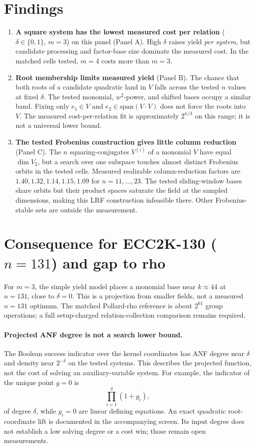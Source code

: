 \documentclass[11pt]{article}
\begin{document}
\section*{Findings}
\begin{enumerate}
\item \textbf{A square system has the lowest measured cost per relation} ($\delta\in\{0,1\}$,
$m=3$) on this panel (Panel A). High $\delta$ raises yield \emph{per system}, but candidate processing
and factor-base size dominate the measured cost. In the matched cells tested, $m=4$ costs more
than $m=3$.
\item \textbf{Root membership limits measured yield} (Panel B). The chance that both roots of a
candidate quadratic land in $V$ falls across the tested $n$ values at fixed $\delta$. The tested
monomial, $w^2$-power, and shifted bases occupy a similar band. Fixing only $e_1\in V$ and
$e_2\in\mathrm{span}(V\!\cdot\!V)$ does not force the roots into $V$. The measured cost-per-relation
fit is approximately $2^{n/3}$ on this range; it is not a universal lower bound.
\item \textbf{The tested Frobenius construction gives little column reduction} (Panel C).
The $n$ squaring-conjugates $V^{(i)}$ of a monomial $V$ have equal $\dim V_2$, but a search over
one subspace touches almost distinct Frobenius orbits in the tested cells. Measured realizable
column-reduction factors are $1.40,1.32,1.14,1.15,1.09$ for $n=11,\dots,23$.
The tested sliding-window bases share orbits but their product spaces saturate the field at
the sampled dimensions, making this LRF construction infeasible there. Other Frobenius-stable
sets are outside the measurement.
\end{enumerate}

\section*{Consequence for ECC2K-130 ($n=131$) and gap to rho}
For $m=3$, the simple yield model places a monomial base near $k\approx44$ at $n=131$, close to
$\delta=0$. This is a projection from smaller fields, not a measured $n=131$ optimum. The matched
Pollard-rho reference is about $2^{61}$ group operations; a full setup-charged relation-collection
comparison remains required.

\paragraph{Projected ANF degree is not a search lower bound.}
The Boolean success indicator over the kernel coordinates has ANF degree near $\delta$ and density
near $2^{-\delta}$ on the tested systems. This describes the projected
function, not the cost of solving an auxiliary-variable system. For example, the indicator of the
unique point $g=0$ is
\[
\prod_{i=1}^{\delta}(1+g_i),
\]
of degree $\delta$, while $g_i=0$ are linear
defining equations. An exact quadratic root-coordinate lift is documented in the
accompanying screen. Its input degree does not
establish a low solving degree or a cost win; those remain open measurements.
\end{document}
